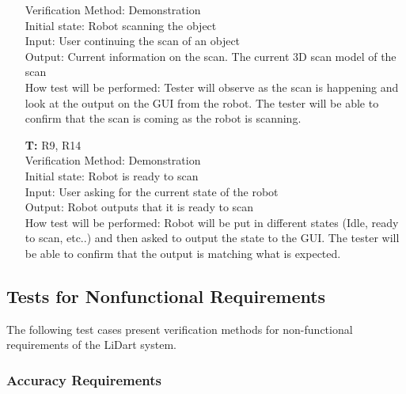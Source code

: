 \documentclass[12pt, titlepage]{article}
\newcounter{tnum} %
\begin{document}
\begin{itemize}
Verification Method: Demonstration\\
Initial state: Robot scanning the object\\
Input: User continuing the scan of an object \\
Output: Current information on the scan. The current 3D scan model of the scan\\
How test will be performed: Tester will observe as the scan is happening and look at the output on the GUI from the robot. The tester will be able to confirm that the scan is coming as the robot is scanning.\\

\item[\textbf{T\refstepcounter{tnum}\thetnum:}]{R9, R14\\}
Verification Method: Demonstration\\
Initial state: Robot is ready to scan\\
Input: User asking for the current state of the robot\\
Output: Robot outputs that it is ready to scan\\
How test will be performed: Robot will be put in different states (Idle, ready to scan, etc..) and then asked to output the state to the GUI. The tester will be able to confirm that the output is matching what is expected. \\

\end{itemize}

\subsection{Tests for Nonfunctional Requirements}




The following test cases present verification methods for non-functional requirements of the LiDart system.

\subsubsection{Accuracy Requirements}
\end{document}
